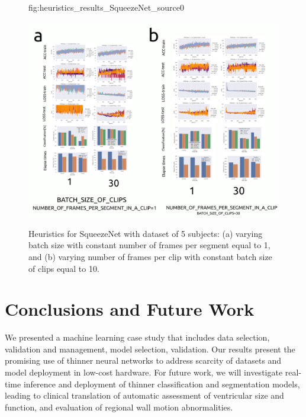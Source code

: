 \documentclass[mlabstract,twocolumn]{jmlr}
\begin{document}
\begin{figure}[ht]%
\floatconts
  {fig:heuristics_results_SqueezeNet_source0}
  {
      \caption{
          Heuristics for SqueezeNet with dataset of 5 subjects: %
          (a) varying batch size with constant number of frames per segment equal to 1, and
          (b) varying number of frames per clip with constant batch size of clips equal to 10.
      }
  }
  {\includegraphics[width=0.95\linewidth]{../figures/heuristics_results_SqueezeNet_source0_with_05-31-subjects/versions/drawing-v03}}%
\end{figure}

\section{Conclusions and Future Work}
We presented a machine learning case study that includes data selection, validation and management, model selection, validation.
Our results present the promising use of thinner neural networks to address scarcity of datasets and model deployment in low-cost hardware.
For future work, we will investigate real-time inference and deployment of thinner classification and segmentation models, leading to clinical translation of automatic assessment of ventricular size and function, and evaluation of regional wall motion abnormalities.
\end{document}
